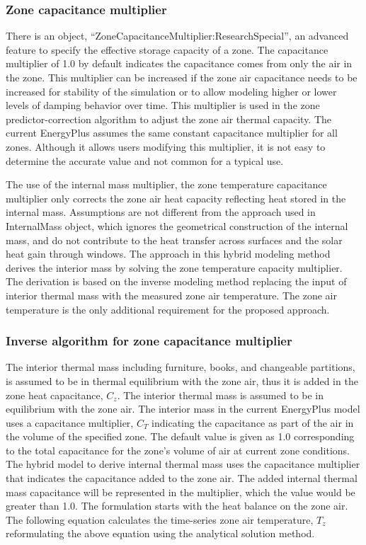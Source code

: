 \subsubsection{Zone capacitance multiplier}\label{zone-capacitance-multiplier}

There is an object, “ZoneCapacitanceMultiplier:ResearchSpecial”, an advanced feature to specify the effective storage capacity of a zone. The capacitance multiplier of 1.0 by default indicates the capacitance comes from only the air in the zone. This multiplier can be increased if the zone air capacitance needs to be increased for stability of the simulation or to allow modeling higher or lower levels of damping behavior over time. This multiplier is used in the zone predictor-correction algorithm to adjust the zone air thermal capacity. The current EnergyPlus assumes the same constant capacitance multiplier for all zones. Although it allows users modifying this multiplier, it is not easy to determine the accurate value and not common for a typical use.

The use of the internal mass multiplier, the zone temperature capacitance multiplier only corrects the zone air heat capacity reflecting heat stored in the internal mass. Assumptions are not different from the approach used in InternalMass object, which ignores the geometrical construction of the internal mass, and do not contribute to the heat transfer across surfaces and the solar heat gain through windows.  The approach in this hybrid modeling method derives the interior mass by solving the zone temperature capacity multiplier. The derivation is based on the inverse modeling method replacing the input of interior thermal mass with the measured zone air temperature. The zone air temperature is the only additional requirement for the proposed approach.


\subsubsection{Inverse algorithm for zone capacitance multiplier}\label{Inverse-algorithm-for-zone-capacitance-multiplier}

The interior thermal mass including furniture, books, and changeable partitions, is assumed to be in thermal equilibrium with the zone air, thus it is added in the zone heat capacitance, $C_z$.  The interior thermal mass is assumed to be in equilibrium with the zone air. The interior mass in the current EnergyPlus model uses a capacitance multiplier, $C_T$ indicating the capacitance as part of the air in the volume of the specified zone. The default value is given as 1.0 corresponding to the total capacitance for the zone’s volume of air at current zone conditions. The hybrid model to derive internal thermal mass uses the capacitance multiplier that indicates the capacitance added to the zone air. The added internal thermal mass capacitance will be represented in the multiplier, which the value would be greater than 1.0. The formulation starts with the heat balance on the zone air. The following equation calculates the time-series zone air temperature, $T_z$ reformulating the above equation using the analytical solution method.


